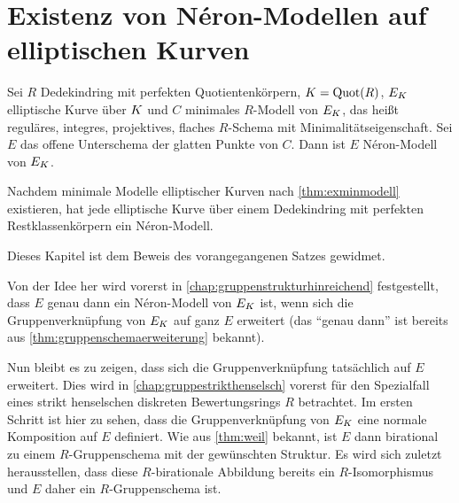 \chapter{Existenz von Néron-Modellen auf elliptischen Kurven}
\label{chap:exneronmodelle}
\begin{Theorem}\label{thm:exneronmodelle}

  Sei $R$ Dedekindring mit perfekten Quotientenkörpern,
  ${K=\operatorname{Quot}(R)}$, $E_{K}$ elliptische Kurve über $K$ und $C$ minimales
  $R$-Modell von $E_{K}$,
  das heißt reguläres, integres, projektives,
  flaches $R$-Schema mit Minimalitätseigenschaft.
  Sei $E$ das offene Unterschema der glatten Punkte von $C$.
  Dann ist $E$ Néron-Modell von $E_{K}$.

  Nachdem minimale Modelle elliptischer
  Kurven nach \ref{thm:exminmodell} existieren, hat jede
  elliptische Kurve über einem Dedekindring mit perfekten
  Restklassenkörpern ein Néron-Modell.
\end{Theorem}
Dieses Kapitel ist dem Beweis des vorangegangenen Satzes gewidmet.

Von der Idee her wird vorerst in
\autoref{chap:gruppenstrukturhinreichend} festgestellt, dass $E$ genau 
dann ein Néron-Modell von $E_{K}$ ist, wenn sich die Gruppenverknüpfung
von $E_{K}$ auf ganz $E$ erweitert (das \enquote{genau dann} ist
bereits aus \ref{thm:gruppenschemaerweiterung} bekannt).

Nun bleibt es zu zeigen, dass sich die Gruppenverknüpfung tatsächlich
auf $E$ erweitert.
Dies wird in \autoref{chap:gruppestrikthenselsch} vorerst für
den Spezialfall eines strikt henselschen diskreten Bewertungsrings
$R$ betrachtet. Im ersten Schritt ist hier zu sehen, dass die
Gruppenverknüpfung von $E_{K}$ eine normale Komposition auf $E$
definiert. Wie aus \ref{thm:weil} bekannt, ist $E$ dann birational zu
einem $R$-Gruppenschema mit der gewünschten Struktur. Es wird sich
zuletzt herausstellen, dass diese $R$-birationale Abbildung bereits
ein $R$-Isomorphismus und $E$ daher ein $R$-Gruppenschema ist.

